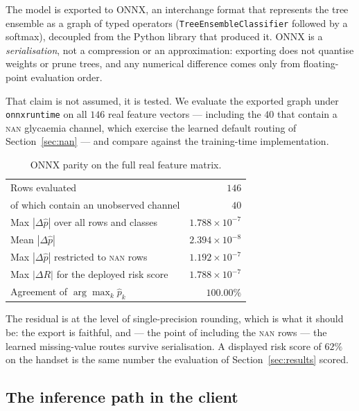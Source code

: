 \documentclass[11pt,a4paper]{article}
\begin{document}
The model is exported to ONNX, an interchange format that represents the tree
ensemble as a graph of typed operators (\texttt{TreeEnsembleClassifier} followed by
a softmax), decoupled from the Python library that produced it. ONNX is a
\emph{serialisation}, not a compression or an approximation: exporting does not
quantise weights or prune trees, and any numerical difference comes only from
floating-point evaluation order.

That claim is not assumed, it is tested. We evaluate the exported graph under
\texttt{onnxruntime} on all $146$ real feature vectors --- including the $40$ that
contain a \textsc{nan} glycaemia channel, which exercise the learned default
routing of Section~\ref{sec:nan} --- and compare against the training-time
implementation.

\begin{table}[htbp]
\centering
\caption{ONNX parity on the full real feature matrix.}
\label{tab:parity}
\small
\begin{tabular}{lr}
\toprule
Rows evaluated & $146$ \\
\quad of which contain an unobserved channel & $40$ \\
Max $|\Delta \hat p|$ over all rows and classes & $1.788\times 10^{-7}$ \\
Mean $|\Delta \hat p|$ & $2.394\times 10^{-8}$ \\
Max $|\Delta \hat p|$ restricted to \textsc{nan} rows & $1.192\times 10^{-7}$ \\
Max $|\Delta R|$ for the deployed risk score & $1.788\times 10^{-7}$ \\
Agreement of $\arg\max_k \hat p_k$ & $100.00\%$ \\
\bottomrule
\end{tabular}
\end{table}

The residual is at the level of single-precision rounding, which is what it should
be: the export is faithful, and --- the point of including the \textsc{nan} rows ---
the learned missing-value routes survive serialisation. A displayed risk score of
$62\%$ on the handset is the same number the evaluation of
Section~\ref{sec:results} scored.

\subsection{The inference path in the client}
\end{document}
